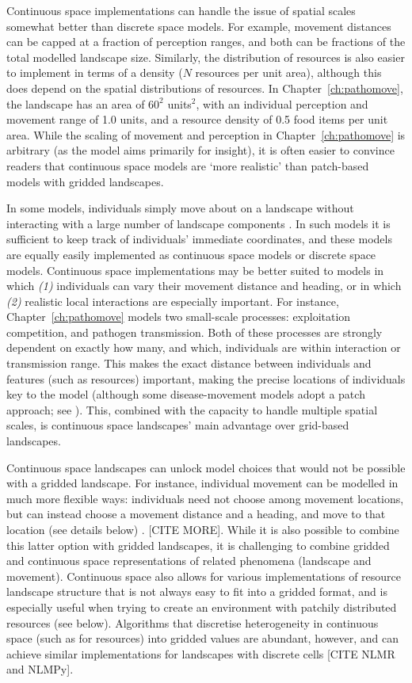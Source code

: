 Continuous space implementations can handle the issue of spatial scales somewhat better than discrete space models.
For example, movement distances can be capped at a fraction of perception ranges, and both can be fractions of the total modelled landscape size.
Similarly, the distribution of resources is also easier to implement in terms of a density ($N$ resources per unit area), although this does depend on the spatial distributions of resources.
In Chapter~\ref{ch:pathomove}, the landscape has an area of $60^2$ units$^2$, with an individual perception and movement range of 1.0 units, and a resource density of 0.5 food items per unit area.
While the scaling of movement and perception in Chapter~\ref{ch:pathomove} is arbitrary (as the model aims primarily for insight), it is often easier to convince readers that continuous space models are `more realistic' than patch-based models with gridded landscapes.

In some models, individuals simply move about on a landscape without interacting with a large number of landscape components \citep[see some models in][]{spiegel2017}.
In such models it is sufficient to keep track of individuals' immediate coordinates, and these models are equally easily implemented as continuous space models or discrete space models.
Continuous space implementations may be better suited to models in which \textit{(1)} individuals can vary their movement distance and heading, or in which \textit{(2)} realistic local interactions are especially important.
For instance, Chapter~\ref{ch:pathomove} models two small-scale processes: exploitation competition, and pathogen transmission.
Both of these processes are strongly dependent on exactly how many, and which, individuals are within interaction or transmission range.
This makes the exact distance between individuals and features (such as resources) important, making the precise locations of individuals key to the model (although some disease-movement models adopt a patch approach; see \citealt{white2018,white2018b,jeltschf.1997}).
This, combined with the capacity to handle multiple spatial scales, is continuous space landscapes' main advantage over grid-based landscapes.

Continuous space landscapes can unlock model choices that would not be possible with a gridded landscape.
For instance, individual movement can be modelled in much more flexible ways: individuals need not choose among movement locations, but can instead choose a movement distance and a heading, and move to that location (see details below) \citep{spiegel2017,mueller2011}. [CITE MORE].
While it is also possible to combine this latter option with gridded landscapes, it is challenging to combine gridded and continuous space representations of related phenomena (landscape and movement).
Continuous space also allows for various implementations of resource landscape structure that is not always easy to fit into a gridded format, and is especially useful when trying to create an environment with patchily distributed resources (see below).
Algorithms that discretise heterogeneity in continuous space (such as for resources) into gridded values are abundant, however, and can achieve similar implementations for landscapes with discrete cells [CITE NLMR and NLMPy].

